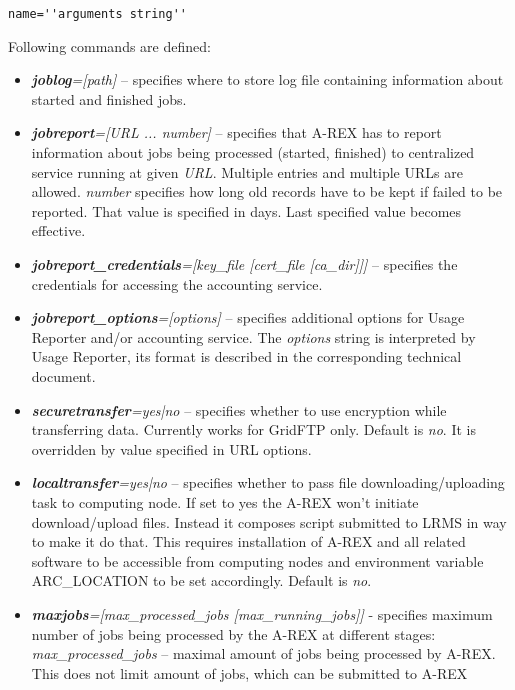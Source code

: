 \documentclass{article}                            %
\begin{document}
\begin{shaded}
\verb|name=''arguments string''|
\end{shaded}
Following commands are defined:

\begin{itemize}
\item \textbf{\textit{joblog}}\textit{={[}path]} -- specifies where to store
log file containing information about started and finished jobs.
\item \textbf{\textit{jobreport}}\textit{={[}URL ... number]} -- specifies
that A-REX has to report information about jobs being processed (started,
finished) to centralized service running at given \textit{URL}. Multiple
entries and multiple URLs are allowed. \textit{number} specifies how
long old records have to be kept if failed to be reported. That value
is specified in days. Last specified value becomes effective.
\item \textbf{\textit{jobreport\_credentials}}\textit{={[}key\_file
    {[}cert\_file {[}ca\_dir]]]} -- specifies the credentials for
  accessing the accounting service.
\item \textbf{\textit{jobreport\_options}}\textit{={[}options]}
  -- specifies additional options for Usage Reporter and/or
  accounting service. The \textit{options} string is interpreted by Usage
  Reporter, its format is described in the corresponding technical document.
\item \textbf{\textit{securetransfer}}\textit{=yes|no} -- specifies whether
to use encryption while transferring data. Currently works for GridFTP
only. Default is \emph{no}. It is overridden by value specified in
URL options.
\item \textbf{\textit{localtransfer}}\textit{=yes|no} -- specifies whether
to pass file downloading/uploading task to computing node. If set
to yes the A-REX won't initiate download/upload files. Instead it
composes script submitted to LRMS in way to make it do that. This
requires installation of A-REX and all related software to be accessible
from computing nodes and environment variable ARC\_LOCATION to be
set accordingly. Default is \emph{no}.
\item \textbf{\textit{maxjobs}}\textit{={[}max\_processed\_jobs {[}max\_running\_jobs]]}
- specifies maximum number of jobs being processed by the A-REX at
different stages:\\
\textit{max\_processed\_jobs} -- maximal amount of jobs being processed
by A-REX. This does not limit amount of jobs, which can be submitted
to A-REX\\

\end{itemize}
\end{document}

